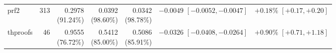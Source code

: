 \documentclass{article}
\begin{document}
\begin{table}[!htbp]
\begin{tabular*}{\textwidth}{@{\extracolsep{\fill}}lrrrrrr}
prf2      & 313   & \shortstack{0.2978\\(91.24\%)} & \shortstack{0.0392\\(98.60\%)} & \shortstack{0.0342\\(98.78\%)} & \shortstack{$-0.0049$\\$[-0.0052,-0.0047]$} & \shortstack{$+0.18\%$\\$[+0.17,+0.20]$} \\
thproofs  & 46    & \shortstack{0.9555\\(76.72\%)} & \shortstack{0.5412\\(85.00\%)} & \shortstack{0.5086\\(85.91\%)} & \shortstack{$-0.0326$\\$[-0.0408,-0.0264]$} & \shortstack{$+0.90\%$\\$[+0.71,+1.18]$} \\
\bottomrule
\end{tabular*}
\end{table}
\end{document}
